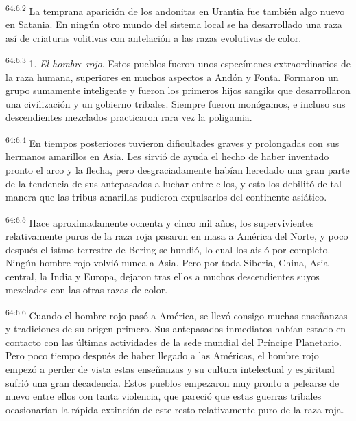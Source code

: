 \par
\textsuperscript{64:6.2} La temprana aparición de los andonitas en Urantia fue también algo nuevo en Satania. En ningún otro mundo del sistema local se ha desarrollado una raza así de criaturas volitivas con antelación a las razas evolutivas de color.

\par
\textsuperscript{64:6.3} 1. \textit{El hombre rojo}. Estos pueblos fueron unos especímenes extraordinarios de la raza humana, superiores en muchos aspectos a Andón y Fonta. Formaron un grupo sumamente inteligente y fueron los primeros hijos sangiks que desarrollaron una civilización y un gobierno tribales. Siempre fueron monógamos, e incluso sus descendientes mezclados practicaron rara vez la poligamia.

\par
\textsuperscript{64:6.4} En tiempos posteriores tuvieron dificultades graves y prolongadas con sus hermanos amarillos en Asia. Les sirvió de ayuda el hecho de haber inventado pronto el arco y la flecha, pero desgraciadamente habían heredado una gran parte de la tendencia de sus antepasados a luchar entre ellos, y esto los debilitó de tal manera que las tribus amarillas pudieron expulsarlos del continente asiático.

\par
\textsuperscript{64:6.5} Hace aproximadamente ochenta y cinco mil años, los supervivientes relativamente puros de la raza roja pasaron en masa a América del Norte, y poco después el istmo terrestre de Bering se hundió, lo cual los aisló por completo. Ningún hombre rojo volvió nunca a Asia. Pero por toda Siberia, China, Asia central, la India y Europa, dejaron tras ellos a muchos descendientes suyos mezclados con las otras razas de color.

\par
\textsuperscript{64:6.6} Cuando el hombre rojo pasó a América, se llevó consigo muchas enseñanzas y tradiciones de su origen primero. Sus antepasados inmediatos habían estado en contacto con las últimas actividades de la sede mundial del Príncipe Planetario. Pero poco tiempo después de haber llegado a las Américas, el hombre rojo empezó a perder de vista estas enseñanzas y su cultura intelectual y espiritual sufrió una gran decadencia. Estos pueblos empezaron muy pronto a pelearse de nuevo entre ellos con tanta violencia, que pareció que estas guerras tribales ocasionarían la rápida extinción de este resto relativamente puro de la raza roja.

